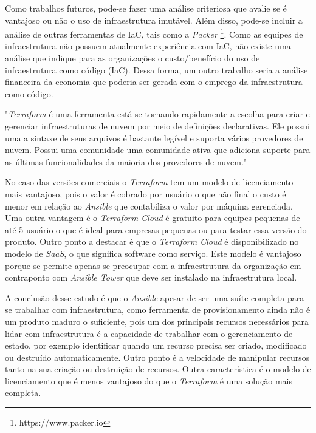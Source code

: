 Como trabalhos futuros, pode-se fazer uma análise criteriosa que avalie se é vantajoso ou não o uso de infraestrutura imutável. Além disso, pode-se incluir a análise de outras ferramentas de IaC, tais como a \textit{Packer} \footnote{https://www.packer.io}. 
Como as equipes de infraestrutura não possuem atualmente experiência com IaC, não existe uma análise que indique para as organizações o custo/benefício do uso de infraestrutura como código (IaC). Dessa forma, um outro trabalho seria a análise financeira da economia que poderia ser gerada com o emprego da infraestrutura como código.

"\textit{Terraform} é uma ferramenta está se tornando rapidamente a escolha para criar e gerenciar infraestruturas de nuvem por meio de definições declarativas. Ele possui uma a sintaxe de seus arquivos é bastante legível e suporta vários provedores de nuvem. Possui uma comunidade uma comunidade ativa que adiciona suporte para as últimas funcionalidades da maioria dos provedores de nuvem." \cite{thoughtworks} 

No caso das versões comerciais o \textit{Terraform} tem um modelo de licenciamento mais vantajoso, pois o valor é cobrado por usuário o que não final o custo é menor em relação ao \textit{Ansible} que contabiliza o valor por máquina gerenciada. Uma outra vantagem é o \textit{Terraform Cloud} é gratuito para equipes pequenas de até 5 usuário o que é ideal para empresas pequenas ou para testar essa versão do produto. Outro ponto a destacar é que o \textit{Terraform Cloud} é disponibilizado no modelo de \textit{SaaS}, o que significa software como serviço. Este modelo é vantajoso porque se permite apenas se preocupar com a infraestrutura da organização em contraponto com \textit{Ansible Tower} que deve ser instalado na infraestrutura local. 

A conclusão desse estudo é que o \textit{Ansible} apesar de ser uma suíte completa para se trabalhar com infraestrutura, como ferramenta de provisionamento ainda não é um produto maduro o suficiente, pois um dos principais recursos necessários para lidar com infraestrutura é a capacidade de trabalhar com o gerenciamento de estado, por exemplo identificar quando um recurso precisa ser criado, modificado ou destruído automaticamente. Outro ponto é a velocidade de manipular recursos tanto na sua criação ou destruição de recursos. Outra característica é o modelo de licenciamento que é menos vantajoso do que o \textit{Terraform} é uma solução mais completa.

